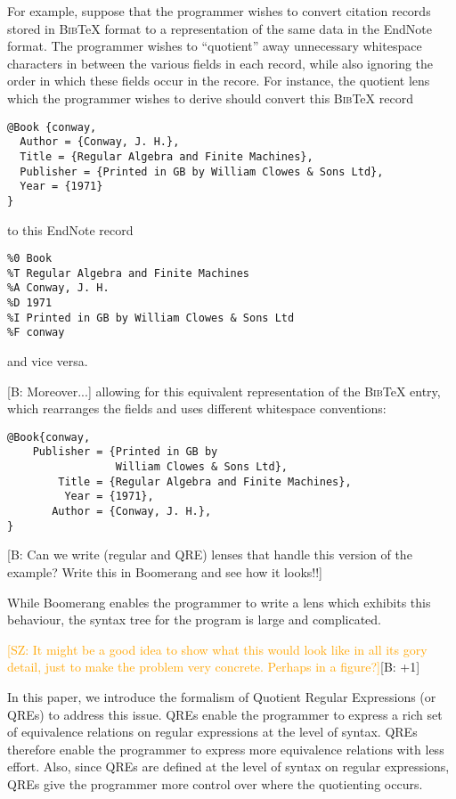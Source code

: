 \documentclass{svproc}
\newcommand{\FINISH}[3]{\ifdraft\textcolor{#1}{[#2: #3]}\fi}
\newcommand{\bcp}[1]{\FINISH{dkred}{B}{#1}}
\newcommand{\saz}[1]{\FINISH{orange}{SZ}{#1}}
\begin{document}
For example, suppose that the programmer wishes to convert citation records
stored in \textsc{Bib}\TeX{} format to a representation of the same data in the
EndNote format. The programmer wishes to ``quotient'' away unnecessary
whitespace characters in between the various fields in each record, while also
ignoring the order in which these fields occur in the recore. For instance, the
quotient lens which the programmer wishes to derive should convert this
\textsc{Bib}\TeX{} record

\begin{verbatim}
@Book {conway,
  Author = {Conway, J. H.},
  Title = {Regular Algebra and Finite Machines},
  Publisher = {Printed in GB by William Clowes & Sons Ltd},
  Year = {1971}
}
\end{verbatim}

\noindent to this EndNote record

\begin{verbatim}
%0 Book
%T Regular Algebra and Finite Machines
%A Conway, J. H.
%D 1971
%I Printed in GB by William Clowes & Sons Ltd
%F conway
\end{verbatim}

\noindent and vice versa.

\bcp{Moreover...}
allowing for this equivalent representation of the \textsc{Bib}\TeX{}
entry, which rearranges the fields and uses different whitespace conventions:

\begin{verbatim}
@Book{conway, 
    Publisher = {Printed in GB by 
                 William Clowes & Sons Ltd},
        Title = {Regular Algebra and Finite Machines},
         Year = {1971},
       Author = {Conway, J. H.},
}
\end{verbatim}
\bcp{Can we write (regular and QRE) lenses that handle this version of the
  example?  Write this in Boomerang and see how it looks!!} 

While Boomerang enables the programmer to write a lens which exhibits this
behaviour, the syntax tree for the program is large and complicated.  

\saz{It might be a good idea to show what this would look like in all its gory
detail, just to make the problem very concrete. Perhaps in a figure?}\bcp{+1}
  
In this paper, we introduce the formalism of Quotient Regular Expressions (or
QREs) to address this issue. QREs enable the programmer to express
a rich set of equivalence relations on regular expressions at the level of
syntax. QREs therefore enable the programmer to express more equivalence
relations with less effort. Also, since QREs are defined at the level of
syntax on regular expressions, QREs give the programmer more control over where
the quotienting occurs.
\end{document}
